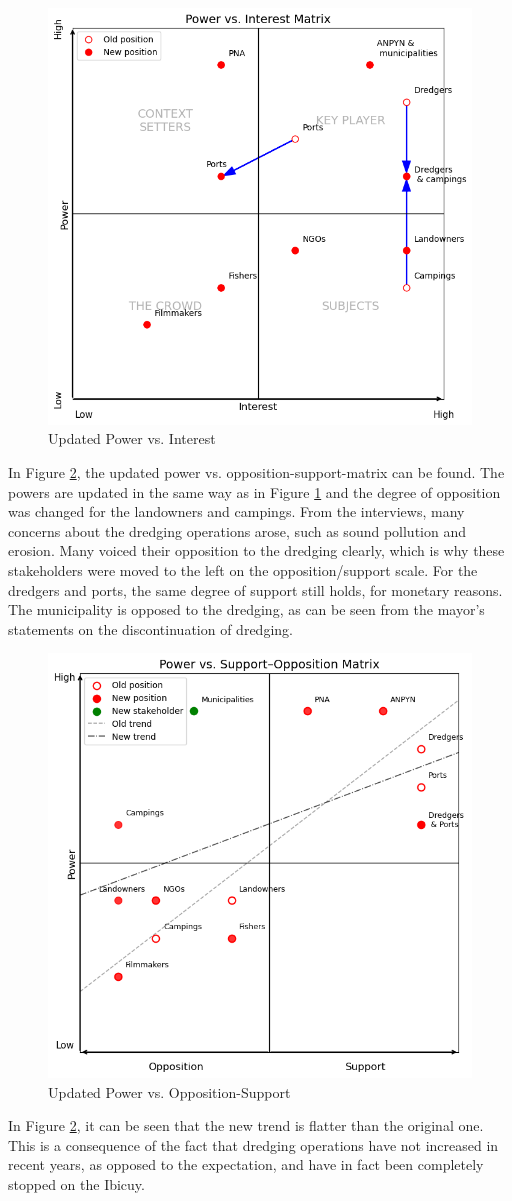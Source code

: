\begin{figure}[H]
    \centering
    \includegraphics[width=0.70\linewidth]{figures/ch3/NewPowerVSInterest.png}
    \caption{Updated Power vs. Interest}
    \label{fig:power-interestNEW}
\end{figure}

In Figure \ref{fig:power-supportNEW}, the updated power vs. opposition-support-matrix can be found. The powers are updated in the same way as in Figure \ref{fig:power-interestNEW} and the degree of opposition was changed for the landowners and campings. From the interviews, many concerns about the dredging operations arose, such as sound pollution and erosion. Many voiced their opposition to the dredging clearly, which is why these stakeholders were moved to the left on the opposition/support scale. For the dredgers and ports, the same degree of support still holds, for monetary reasons. The municipality is opposed to the dredging, as can be seen from the mayor's statements on the discontinuation of dredging.

\begin{figure}[H]
    \centering
    \includegraphics[width=0.70\linewidth]{figures/ch3/NewPowerVSSupport.png}
    \caption{Updated Power vs. Opposition-Support}
    \label{fig:power-supportNEW}
\end{figure}

In Figure \ref{fig:power-supportNEW}, it can be seen that the new trend is flatter than the original one. This is a consequence of the fact that dredging operations have not increased in recent years, as opposed to the expectation, and have in fact been completely stopped on the Ibicuy.